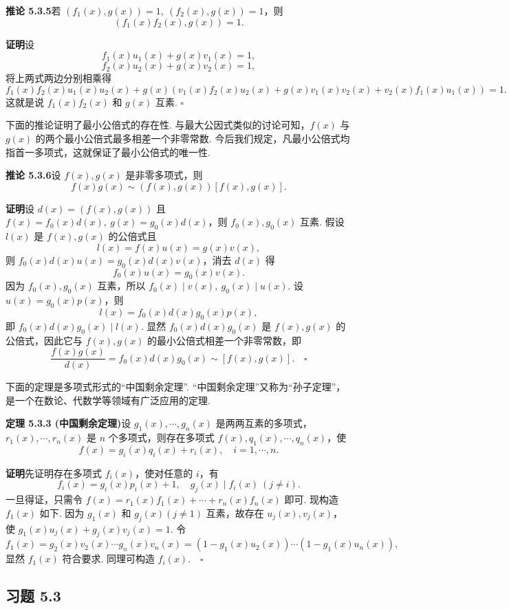 \documentclass[UTF8, 12pt, fontset=fandol, oneside]{ctexart}
\begin{document}
\noindent\textbf{推论 5.3.5}\quad 若 $(f_1(x),g(x))=1,\ (f_2(x),g(x))=1$，则
\[
(f_1(x)f_2(x),g(x))=1.
\]

\noindent\textbf{证明}\quad 设
\[
f_1(x)u_1(x)+g(x)v_1(x)=1,
\]
\[
f_2(x)u_2(x)+g(x)v_2(x)=1,
\]
将上两式两边分别相乘得
\[
f_1(x)f_2(x)u_1(x)u_2(x)+g(x)(v_1(x)f_2(x)u_2(x)+g(x)v_1(x)v_2(x)+v_2(x)f_1(x)u_1(x))=1.
\]
这就是说 $f_1(x)f_2(x)$ 和 $g(x)$ 互素. $\square$

下面的推论证明了最小公倍式的存在性. 与最大公因式类似的讨论可知，$f(x)$ 与 $g(x)$ 的两个最小公倍式最多相差一个非零常数. 今后我们规定，凡最小公倍式均指首一多项式，这就保证了最小公倍式的唯一性.

\noindent\textbf{推论 5.3.6}\quad 设 $f(x),g(x)$ 是非零多项式，则
\[
f(x)g(x)\sim (f(x),g(x))[f(x),g(x)].
\]

\noindent\textbf{证明}\quad 设 $d(x)=(f(x),g(x))$ 且 $f(x)=f_0(x)d(x),\ g(x)=g_0(x)d(x)$，则 $f_0(x),g_0(x)$ 互素. 假设 $l(x)$ 是 $f(x),g(x)$ 的公倍式且
\[
l(x)=f(x)u(x)=g(x)v(x),
\]
则 $f_0(x)d(x)u(x)=g_0(x)d(x)v(x)$，消去 $d(x)$ 得
\[
f_0(x)u(x)=g_0(x)v(x).
\]
因为 $f_0(x),g_0(x)$ 互素，所以 $f_0(x)\mid v(x),\ g_0(x)\mid u(x)$. 设 $u(x)=g_0(x)p(x)$，则
\[
l(x)=f_0(x)d(x)g_0(x)p(x),
\]
即 $f_0(x)d(x)g_0(x)\mid l(x)$. 显然 $f_0(x)d(x)g_0(x)$ 是 $f(x),g(x)$ 的公倍式，因此它与 $f(x),g(x)$ 的最小公倍式相差一个非零常数，即
\[
\frac{f(x)g(x)}{d(x)}=f_0(x)d(x)g_0(x)\sim [f(x),g(x)].\quad \square
\]

下面的定理是多项式形式的“中国剩余定理”. “中国剩余定理”又称为“孙子定理”，是一个在数论、代数学等领域有广泛应用的定理.

\noindent\textbf{定理 5.3.3 (中国剩余定理)}\quad 设 $g_1(x),\cdots,g_n(x)$ 是两两互素的多项式，$r_1(x),\cdots,r_n(x)$ 是 $n$ 个多项式，则存在多项式 $f(x),q_1(x),\cdots,q_n(x)$，使
\[
f(x)=g_i(x)q_i(x)+r_i(x),\quad i=1,\cdots,n.
\]

\noindent\textbf{证明}\quad 先证明存在多项式 $f_i(x)$，使对任意的 $i$，有
\[
f_i(x)=g_i(x)p_i(x)+1,\quad g_j(x)\mid f_i(x)\ (j\neq i).
\]
一旦得证，只需令 $f(x)=r_1(x)f_1(x)+\cdots+r_n(x)f_n(x)$ 即可. 现构造 $f_1(x)$ 如下. 因为 $g_1(x)$ 和 $g_j(x)(j\neq 1)$ 互素，故存在 $u_j(x),v_j(x)$，使 $g_1(x)u_j(x)+g_j(x)v_j(x)=1$. 令
\[
f_1(x)=g_2(x)v_2(x)\cdots g_n(x)v_n(x)=(1-g_1(x)u_2(x))\cdots(1-g_1(x)u_n(x)),
\]
显然 $f_1(x)$ 符合要求. 同理可构造 $f_i(x).\quad \square$

\subsection*{习题 5.3}
\end{document}
